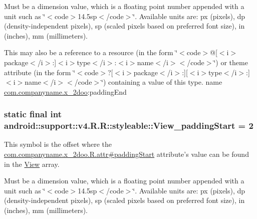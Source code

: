 Must be a dimension value, which is a floating point number appended with a unit such as \char`\"{}$<$code$>$14.5sp$<$/code$>$\char`\"{}. Available units are: px (pixels), dp (density-independent pixels), sp (scaled pixels based on preferred font size), in (inches), mm (millimeters). 

This may also be a reference to a resource (in the form \char`\"{}$<$code$>$@\mbox{[}$<$i$>$package$<$/i$>$:\mbox{]}$<$i$>$type$<$/i$>$:$<$i$>$name$<$/i$>$$<$/code$>$\char`\"{}) or theme attribute (in the form \char`\"{}$<$code$>$?\mbox{[}$<$i$>$package$<$/i$>$:\mbox{]}\mbox{[}$<$i$>$type$<$/i$>$:\mbox{]}$<$i$>$name$<$/i$>$$<$/code$>$\char`\"{}) containing a value of this type.  name \hyperlink{namespacecom_1_1companyname_1_1x__2doo}{com.companyname.x\_\-2doo}:paddingEnd \hypertarget{classandroid_1_1support_1_1v4_1_1_r_1_1styleable_7f4d8c133f2bc4da71daa16cdc57307b}{
\subsubsection[{View\_\-paddingStart}]{\setlength{\rightskip}{0pt plus 5cm}static final int android::support::v4.R.R::styleable::View\_\-paddingStart = 2}}
\label{classandroid_1_1support_1_1v4_1_1_r_1_1styleable_7f4d8c133f2bc4da71daa16cdc57307b}


This symbol is the offset where the \hyperlink{classcom_1_1companyname_1_1x__2doo_1_1_r_1_1attr_7ef8bbd25f69aed02cc2af6d0ca7cb2c}{com.companyname.x\_\-2doo.R.attr\#paddingStart} attribute's value can be found in the \hyperlink{classandroid_1_1support_1_1v4_1_1_r_1_1styleable_b4963d78f1fa8984188692ee48ea20d2}{View} array.

Must be a dimension value, which is a floating point number appended with a unit such as \char`\"{}$<$code$>$14.5sp$<$/code$>$\char`\"{}. Available units are: px (pixels), dp (density-independent pixels), sp (scaled pixels based on preferred font size), in (inches), mm (millimeters). 

